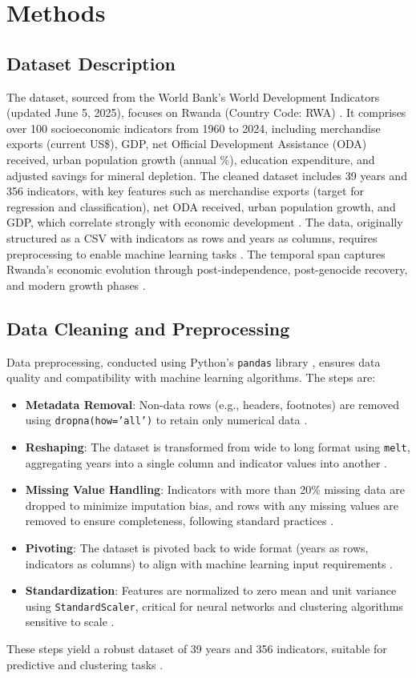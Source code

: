 \documentclass[12pt]{article}
\begin{document}
	\section{Methods}
	
	\subsection{Dataset Description}
	The dataset, sourced from the World Bank's World Development Indicators (updated June 5, 2025), focuses on Rwanda (Country Code: RWA) \citep{wdi}. It comprises over 100 socioeconomic indicators from 1960 to 2024, including merchandise exports (current US\$), GDP, net Official Development Assistance (ODA) received, urban population growth (annual \%), education expenditure, and adjusted savings for mineral depletion. The cleaned dataset includes 39 years and 356 indicators, with key features such as merchandise exports (target for regression and classification), net ODA received, urban population growth, and GDP, which correlate strongly with economic development \citep{wdi, rwanda_vision}. The data, originally structured as a CSV with indicators as rows and years as columns, requires preprocessing to enable machine learning tasks \citep{wdi}. The temporal span captures Rwanda's economic evolution through post-independence, post-genocide recovery, and modern growth phases \citep{eac}.
	
	\subsection{Data Cleaning and Preprocessing}
	Data preprocessing, conducted using Python's \texttt{pandas} library \citep{pandas}, ensures data quality and compatibility with machine learning algorithms. The steps are:
	\begin{itemize}
		\item \textbf{Metadata Removal}: Non-data rows (e.g., headers, footnotes) are removed using \texttt{dropna(how='all')} to retain only numerical data \citep{pandas}.
		\item \textbf{Reshaping}: The dataset is transformed from wide to long format using \texttt{melt}, aggregating years into a single column and indicator values into another \citep{pandas}.
		\item \textbf{Missing Value Handling}: Indicators with more than 20\% missing data are dropped to minimize imputation bias, and rows with any missing values are removed to ensure completeness, following standard practices \citep{imputation}.
		\item \textbf{Pivoting}: The dataset is pivoted back to wide format (years as rows, indicators as columns) to align with machine learning input requirements \citep{pandas}.
		\item \textbf{Standardization}: Features are normalized to zero mean and unit variance using \texttt{StandardScaler}, critical for neural networks and clustering algorithms sensitive to scale \citep{scikit-learn}.
	\end{itemize}
	These steps yield a robust dataset of 39 years and 356 indicators, suitable for predictive and clustering tasks \citep{wdi}.
	
\end{document}
